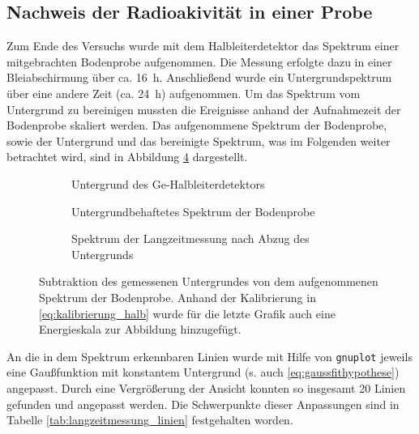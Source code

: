 \documentclass[11pt, a4paper]{article}
\numberwithin{equation}{section}
\begin{document}
\subsection{Nachweis der Radioakivität in einer Probe}

Zum Ende des Versuchs wurde mit dem Halbleiterdetektor das Spektrum einer mitgebrachten Bodenprobe aufgenommen.
Die Messung erfolgte dazu in einer Bleiabschirmung über ca. \SI{16}{\hour}. Anschließend wurde ein Untergrundspektrum über eine andere Zeit (ca. \SI{24}{\hour}) aufgenommen.
Um das Spektrum vom Untergrund zu bereinigen mussten die Ereignisse anhand der Aufnahmezeit der Bodenprobe skaliert werden.
Das aufgenommene Spektrum der Bodenprobe, sowie der Untergrund und das bereinigte Spektrum, was im Folgenden weiter betrachtet wird, sind in Abbildung \ref{fig:langzeitmessung_untergrundabzug} dargestellt.
\begin{figure}[hp]
	\centering
	\begin{subfigure}[b]{0.65\textwidth}
		\resizebox{!}{0.275\textheight}{
			
		}
		\caption{Untergrund des Ge-Halbleiterdetektors}
		\label{fig:untergrund}
	\end{subfigure}
	
	\begin{subfigure}[b]{0.65\textwidth}
		\resizebox{!}{0.275\textheight}{
			
		}
		\caption{Untergrundbehaftetes Spektrum der Bodenprobe}
		\label{fig:probe_mit_untergrund}
	\end{subfigure}
	
	\begin{subfigure}[b]{0.65\textwidth}
		\resizebox{!}{0.28\textheight}{
			
		}
		\caption{Spektrum der Langzeitmessung nach Abzug des Untergrunds}
		\label{fig:probe_ohne_untergrund}
	\end{subfigure}
	\caption{Subtraktion des gemessenen Untergrundes von dem aufgenommenen Spektrum der Bodenprobe. Anhand der Kalibrierung in \eqref{eq:kalibrierung_halb} wurde für die letzte Grafik auch eine Energieskala zur Abbildung hinzugefügt.}
	\label{fig:langzeitmessung_untergrundabzug}
\end{figure}
An die in dem Spektrum erkennbaren Linien wurde mit Hilfe von \texttt{gnuplot} jeweils eine Gaußfunktion mit konstantem Untergrund (s. auch \eqref{eq:gaussfithypothese}) angepasst.
Durch eine Vergrößerung der Ansicht konnten so insgesamt \num{20} Linien gefunden und angepasst werden.
Die Schwerpunkte dieser Anpassungen sind in Tabelle \ref{tab:langzeitmessung_linien} festgehalten worden. 
\end{document}
